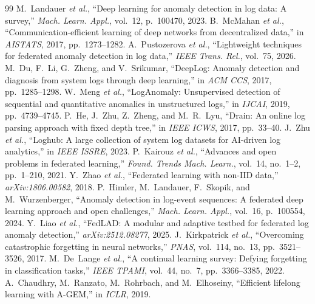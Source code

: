 \documentclass[conference]{IEEEtran}
\begin{document}
\begin{thebibliography}{99}
 M.~Landauer \emph{et al.}, ``Deep learning for anomaly detection in log
data: A survey,'' \emph{Mach. Learn. Appl.}, vol.~12, p.~100470, 2023.
 B.~McMahan \emph{et al.}, ``Communication-efficient learning of
deep networks from decentralized data,'' in \emph{AISTATS}, 2017, pp.~1273--1282.
 A.~Pustozerova \emph{et al.}, ``Lightweight techniques for
federated anomaly detection in log data,'' \emph{IEEE Trans. Rel.}, vol.~75, 2026.
 M.~Du, F.~Li, G.~Zheng, and V.~Srikumar, ``DeepLog: Anomaly detection and
diagnosis from system logs through deep learning,'' in \emph{ACM CCS}, 2017, pp.~1285--1298.
 W.~Meng \emph{et al.}, ``LogAnomaly: Unsupervised detection of sequential
and quantitative anomalies in unstructured logs,'' in \emph{IJCAI}, 2019, pp.~4739--4745.
 P.~He, J.~Zhu, Z.~Zheng, and M.~R.~Lyu, ``Drain: An online log parsing approach
with fixed depth tree,'' in \emph{IEEE ICWS}, 2017, pp.~33--40.
 J.~Zhu \emph{et al.}, ``Loghub: A large collection of system log datasets for
AI-driven log analytics,'' in \emph{IEEE ISSRE}, 2023.
 P.~Kairouz \emph{et al.}, ``Advances and open problems in federated
learning,'' \emph{Found. Trends Mach. Learn.}, vol.~14, no.~1--2, pp.~1--210, 2021.
 Y.~Zhao \emph{et al.}, ``Federated learning with non-IID data,''
\emph{arXiv:1806.00582}, 2018.
 P.~Himler, M.~Landauer, F.~Skopik, and M.~Wurzenberger, ``Anomaly
detection in log-event sequences: A federated deep learning approach and open challenges,'' \emph{Mach.
Learn. Appl.}, vol.~16, p.~100554, 2024.
 Y.~Liao \emph{et al.}, ``FedLAD: A modular and adaptive testbed for federated log
anomaly detection,'' \emph{arXiv:2512.08277}, 2025.
 J.~Kirkpatrick \emph{et al.}, ``Overcoming catastrophic forgetting
in neural networks,'' \emph{PNAS}, vol.~114, no.~13, pp.~3521--3526, 2017.
 M.~De~Lange \emph{et al.}, ``A continual learning survey: Defying
forgetting in classification tasks,'' \emph{IEEE TPAMI}, vol.~44, no.~7, pp.~3366--3385, 2022.
 A.~Chaudhry, M.~Ranzato, M.~Rohrbach, and M.~Elhoseiny, ``Efficient lifelong
learning with A-GEM,'' in \emph{ICLR}, 2019.
\end{thebibliography}
\end{document}
